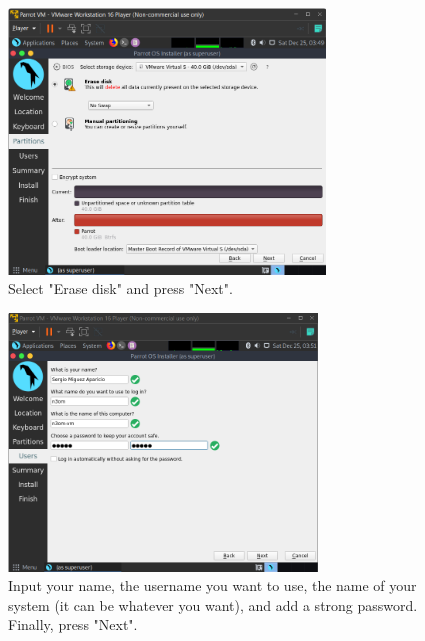 \documentclass[a4paper]{article}
\begin{document}
    \begin{figure}[h!]
        \centering
        \includegraphics[width=0.75\textwidth]{Images/Install_OS/OS_6.png}
        \caption{Select "Erase disk" and press "Next".}
    \end{figure}

    \clearpage
    \begin{figure}[h]
        \centering
        \includegraphics[width=0.73\textwidth]{Images/Install_OS/OS_7.png}
        \caption{Input your name, the username you want to use, the name of your system (it can be whatever
        you want), and add a strong password. Finally, press "Next".}
    \end{figure}

    \vfill
\end{document}
